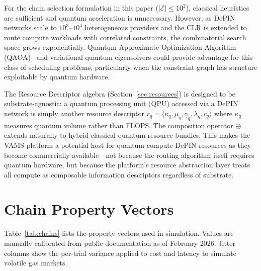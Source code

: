 \documentclass[conference, 10pt, twocolumn]{IEEEtran}
\begin{document}
For the chain selection formulation in this paper ($|\mathcal{E}| \leq
10^2$), classical heuristics are sufficient and quantum acceleration
is unnecessary.  However, as DePIN networks scale to $10^3$--$10^4$
heterogeneous providers and the CLR is extended to route compute
workloads with correlated constraints, the combinatorial search space
grows exponentially.  Quantum Approximate Optimization Algorithm
(QAOA)~\cite{farhi2014quantum} and variational quantum
eigensolvers could provide advantage for this class of scheduling
problems, particularly when the constraint graph has structure
exploitable by quantum hardware.

The Resource Descriptor algebra (Section~\ref{sec:resources}) is
designed to be substrate-agnostic: a quantum processing unit (QPU)
accessed via a DePIN network is simply another resource descriptor
$r_q = \langle \kappa_q, \mu_q, \gamma_q, \lambda_q, c_q \rangle$
where $\kappa_q$ measures quantum volume rather than FLOPS.  The
composition operator $\oplus$ extends naturally to hybrid
classical-quantum resource bundles.  This makes the VAMS platform a
potential host for quantum compute DePIN resources as they become
commercially available---not because the routing algorithm itself
requires quantum hardware, but because the platform's resource
abstraction layer treats all compute as composable information
descriptors regardless of substrate.




\appendix

\section{Chain Property Vectors}
\label{app:chains}

Table~\ref{tab:chains} lists the property vectors used in simulation.
Values are manually calibrated from public documentation as of
February 2026.  Jitter columns show the per-trial variance applied to
cost and latency to simulate volatile gas markets.
\end{document}
